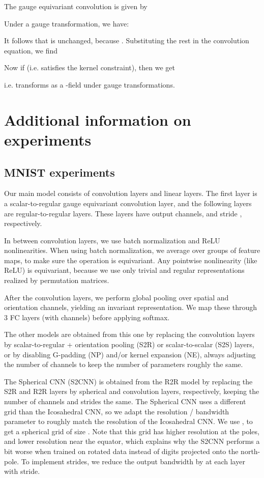 \documentclass{article}
\begin{document}
The gauge equivariant convolution is given by


Under a gauge transformation, we have:


It follows that  is unchanged, because .
Substituting the rest in the convolution equation, we find

Now if  (i.e.  satisfies the kernel constraint), then we get

i.e.  transforms as a -field under gauge transformations.


\section{Additional information on experiments}

\subsection{MNIST experiments}

Our main model consists of  convolution layers and  linear layers.
The first layer is a scalar-to-regular gauge equivariant convolution layer, and the following  layers are regular-to-regular layers.
These layers have  output channels, and stride , respectively.

In between convolution layers, we use batch normalization \cite{ioffeBatchNormalizationAccelerating2015} and ReLU nonlinearities.
When using batch normalization, we average over groups of  feature maps, to make sure the operation is equivariant.
Any pointwise nonlinearity (like ReLU) is equivariant, because we use only trivial and regular representations realized by permutation matrices.

After the convolution layers, we perform global pooling over spatial and orientation channels, yielding an invariant representation.
We map these through 3 FC layers (with  channels) before applying softmax.

The other models are obtained from this one by replacing the convolution layers by scalar-to-regular + orientation pooling (S2R) or scalar-to-scalar (S2S) layers, or by disabling G-padding (NP) and/or kernel expansion (NE), always adjusting the number of channels to keep the number of parameters roughly the same.

The Spherical CNN (S2CNN) is obtained from the R2R model by replacing the S2R and R2R layers by spherical and  convolution layers, respectively, keeping the number of channels and strides the same.
The Spherical CNN uses a different grid than the Icosahedral CNN, so we adapt the resolution / bandwidth parameter  to roughly match the resolution of the Icosahedral CNN.
We use , to get a spherical grid of size .
Note that this grid has higher resolution at the poles, and lower resolution near the equator, which explains why the S2CNN performs a bit worse when trained on rotated data instead of digits projected onto the north-pole.
To implement strides, we reduce the output bandwidth by  at each layer with stride.
\end{document}
